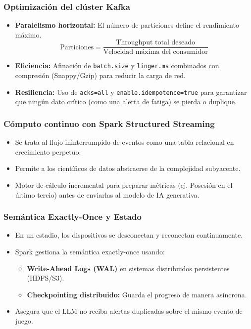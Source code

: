 \documentclass[aspectratio=169]{beamer}
\begin{document}
\begin{frame}\frametitle{Optimización del clúster Kafka}
\begin{itemize}
    \item \textbf{Paralelismo horizontal:} El número de particiones define el rendimiento máximo.
    \[
    \text{Particiones} = \frac{\text{Throughput total deseado}}{\text{Velocidad máxima del consumidor}}
    \]
    \item \textbf{Eficiencia:} Afinación de \texttt{batch.size} y \texttt{linger.ms} combinados con compresión (Snappy/Gzip) para reducir la carga de red.
    \item \textbf{Resiliencia:} Uso de \texttt{acks=all} y \texttt{enable.idempotence=true} para garantizar que ningún dato crítico (como una alerta de fatiga) se pierda o duplique.
\end{itemize}
\end{frame}

\begin{frame}\frametitle{Cómputo continuo con Spark Structured Streaming}
\begin{itemize}
    \item Se trata al flujo ininterrumpido de eventos como una tabla relacional en crecimiento perpetuo.
    \item Permite a los científicos de datos abstraerse de la complejidad subyacente.
    \item Motor de cálculo incremental para preparar métricas (ej. Posesión en el último tercio) antes de enviarlas al modelo de IA generativa.
\end{itemize}
\end{frame}

\begin{frame}\frametitle{Semántica Exactly-Once y Estado}
\begin{itemize}
    \item En un estadio, los dispositivos se desconectan y reconectan continuamente.
    \item Spark gestiona la semántica exactly-once usando:
    \begin{itemize}
        \item \textbf{Write-Ahead Logs (WAL)} en sistemas distribuidos persistentes (HDFS/S3).
        \item \textbf{Checkpointing distribuido:} Guarda el progreso de manera asíncrona.
    \end{itemize}
    \item Asegura que el LLM no reciba alertas duplicadas sobre el mismo evento de juego.
\end{itemize}
\end{frame}
\end{document}
